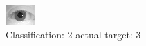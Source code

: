 \begin{figure}[h!]
\begin{center}
\includegraphics[width=0.60\columnwidth]{figures/ID1104_class_2_target_3.png}
\end{center}
\caption{ Classification: 2 actual target: 3}
\label{fig:ID1104_class_2_target_3}
\end{figure}

